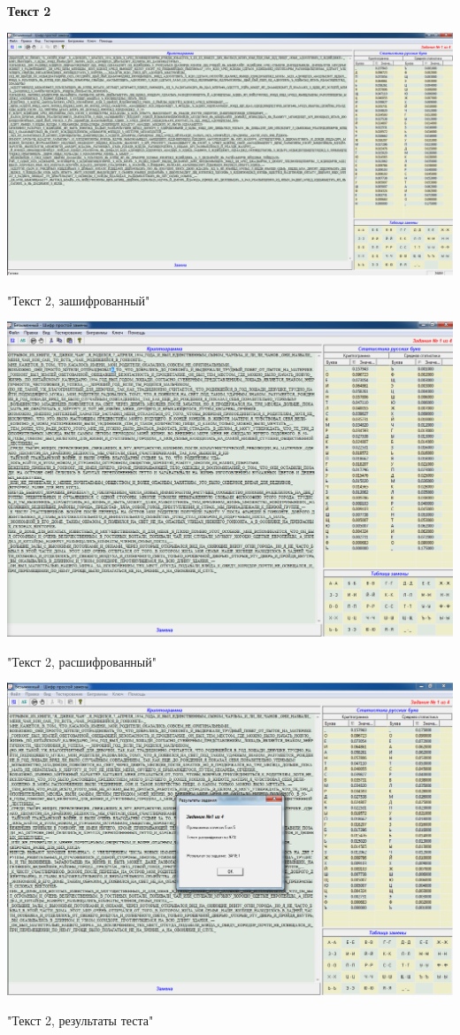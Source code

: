\documentclass[a4paper,14pt]{extarticle}
\begin{document}
    \newpage
    \begin{center}
        \textbf{Текст 2}
    \end{center}
    \begin{center}
        \includegraphics[scale=0.3]{pics/2.png}

        "Текст 2, зашифрованный"
    \end{center}
    \begin{center}
        \includegraphics[scale=0.3]{pics/2_1.png}

        "Текст 2, расшифрованный"
    \end{center}
    \begin{center}
        \includegraphics[scale=0.3]{pics/2_2.png}

        "Текст 2, результаты теста"
    \end{center}
\end{document}

